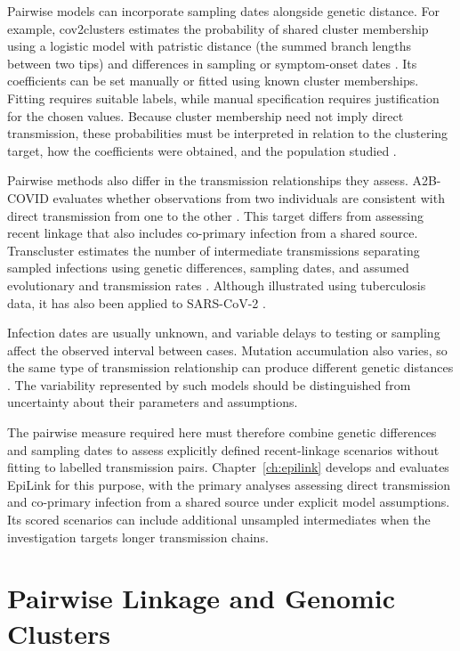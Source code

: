 Pairwise models can incorporate sampling dates alongside genetic distance. For example, cov2clusters estimates the probability of shared cluster membership using a logistic model with patristic distance (the summed branch lengths between two tips) and differences in sampling or symptom-onset dates \citep{Sobkowiak2022}. Its coefficients can be set manually or fitted using known cluster memberships. Fitting requires suitable labels, while manual specification requires justification for the chosen values. Because cluster membership need not imply direct transmission, these probabilities must be interpreted in relation to the clustering target, how the coefficients were obtained, and the population studied \citep{Sobkowiak2022,Sobkowiak2023}.

Pairwise methods also differ in the transmission relationships they assess. A2B-COVID evaluates whether observations from two individuals are consistent with direct transmission from one to the other \citep{Illingworth2022}. This target differs from assessing recent linkage that also includes co-primary infection from a shared source. Transcluster estimates the number of intermediate transmissions separating sampled infections using genetic differences, sampling dates, and assumed evolutionary and transmission rates \citep{Stimson2019}. Although illustrated using tuberculosis data, it has also been applied to SARS-CoV-2 \citep{GallegoGarcia2022}.

Infection dates are usually unknown, and variable delays to testing or sampling affect the observed interval between cases. Mutation accumulation also varies, so the same type of transmission relationship can produce different genetic distances \citep{Jombart2014,Didelot2017,DeMaio2016}. The variability represented by such models should be distinguished from uncertainty about their parameters and assumptions.

The pairwise measure required here must therefore combine genetic differences and sampling dates to assess explicitly defined recent-linkage scenarios without fitting to labelled transmission pairs. Chapter~\ref{ch:epilink} develops and evaluates EpiLink for this purpose, with the primary analyses assessing direct transmission and co-primary infection from a shared source under explicit model assumptions. Its scored scenarios can include additional unsampled intermediates when the investigation targets longer transmission chains.

\section{Pairwise Linkage and Genomic Clusters}\label{sec:ch2_compatibility_graphs}

